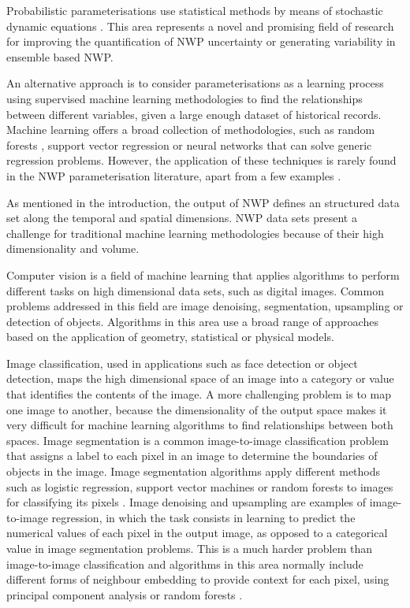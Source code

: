 \documentclass[twocol]{ametsoc}
\begin{document}
Probabilistic parameterisations use statistical methods by means of stochastic dynamic equations \citep{berner2017stochastic}. This area represents a novel and promising field of research for improving the quantification of NWP uncertainty or generating variability in ensemble based NWP.

An alternative approach is to consider parameterisations as a learning process using supervised machine learning methodologies to find the relationships between different variables, given a large enough dataset of historical records. Machine learning offers a broad collection of methodologies, such as random forests \citep{breiman2001random}, support vector regression or neural networks that can solve generic regression problems. However, the application of these techniques is rarely found in the NWP parameterisation literature, apart from a few examples \citep{lipponen2013correction}.

As mentioned in the introduction, the output of NWP defines an structured data set along the temporal and spatial dimensions. NWP data sets present a challenge for traditional machine learning methodologies because of their high dimensionality and volume. 

Computer vision is a field of machine learning that applies algorithms to perform different tasks on high dimensional data sets, such as digital images. Common problems addressed in this field are image denoising, segmentation, upsampling or detection of objects. Algorithms in this area use a broad range of approaches based on the application of geometry, statistical or physical models. 

Image classification, used in applications such as face detection or object detection, maps the high dimensional space of an image into a category \citep{haralick1973textural} or value \citep{takeda2007kernel} that identifies the contents of the image. A more challenging problem is to map one image to another, because the dimensionality of the output space makes it very difficult for machine learning algorithms to find relationships between both spaces. Image segmentation is a common image-to-image classification problem that assigns a label to each pixel in an image to determine the boundaries of objects in the image. Image segmentation algorithms apply different methods such as logistic regression, support vector machines or random forests to images for classifying its pixels \citep{haralick1985image,pal1993review,pal2005random}. Image denoising and upsampling are examples of image-to-image regression, in which the task consists in learning to predict the numerical values of each pixel in the output image, as opposed to a categorical value in image segmentation problems. This is a much harder problem than image-to-image classification and algorithms in this area normally include different forms of neighbour embedding to provide context for each pixel, using principal component analysis or random forests \citep{chang2004super,schulter2015fast}.
\end{document}
